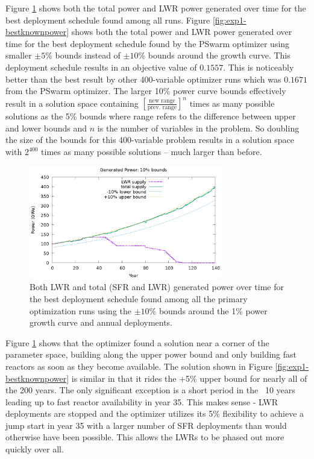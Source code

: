 Figure \ref{fig:exp1-bestfoundpower} shows both the total power and LWR power
generated over time for the best deployment schedule found among all runs.
Figure \ref{fig:exp1-bestknownpower} shows both the total power and LWR power
generated over time for the best deployment schedule found by the PSwarm
optimizer using smaller $\pm5\%$ bounds instead of $\pm10\%$ bounds around the
growth curve. This deployment schedule results in an objective value of
$0.1557$.  This is noticeably better than the best result by other
400-variable optimizer runs which was $0.1671$ from the PSwarm optimizer.  The
larger 10\% power curve bounds effectively result in a solution space
containing $[\frac{\text{new range}}{\text{prev. range}}]^{n}$ times as many
possible solutions as the 5\% bounds where range refers to the difference
between upper and lower bounds and $n$ is the number of variables in the
problem. So doubling the size of the bounds for this 400-variable problem
results in a solution space with $2^{400}$ times as many possible solutions --
much larger than before.

\begin{figure}
    \centering
    \includegraphics[width=0.75\textwidth]{best-found-power.eps}
    \caption[Power for best build schedule with $\pm10\%$ bounds]{ Both
      \gls{LWR} and total (\gls{SFR} and \gls{LWR}) generated power over time
      for the best deployment schedule found among all the primary
      optimization runs using the $\pm10\%$ bounds around the 1\% power growth
      curve and annual deployments.  }

    \label{fig:exp1-bestfoundpower}
\end{figure}

Figure \ref{fig:exp1-bestfoundpower} shows that the optimizer found a solution
near a corner of the parameter space, building along the upper power bound and
only building fast reactors as soon as they become available.  The solution
shown in Figure \ref{fig:exp1-bestknownpower} is similar in that it rides the
+5\% upper bound for nearly all of the 200 years.  The only significant
exception is a short period in the ~10 years leading up to fast reactor
availability in year 35. This makes sense - \gls{LWR} deployments are stopped
and the optimizer utilizes its 5\% flexibility to achieve a jump start in year
35 with a larger number of \gls{SFR} deployments than would otherwise have been
possible.  This allows the \gls{LWR}s to be phased out more quickly over all.

